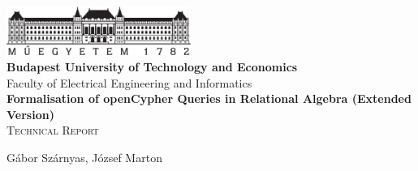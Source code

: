 \begin{titlepage}
	\begin{center}
		\includegraphics[width=60mm,keepaspectratio]{figures/bme-logo}\\
		\vspace{0.3cm}
		\textbf{Budapest University of Technology and Economics}\\
		\textmd{Faculty of Electrical Engineering and Informatics}\\[5cm]

		\vspace{0.4cm}
		{\huge \bfseries Formalisation of openCypher Queries in Relational Algebra (Extended Version)}\\[0.8cm]
		\vspace{0.5cm}
		\textsc{\Large Technical Report}
		
		\vfill

		{\Large Gábor Szárnyas, József Marton}\\


		\vspace{1cm}

	\end{center}
\end{titlepage}

\addtocounter{page}{1}
